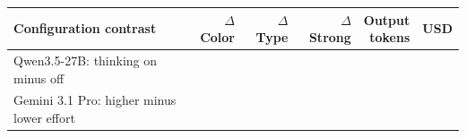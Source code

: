 \begin{tabular}{@{}lrrrrr@{}}
\toprule
Configuration contrast & $\Delta$ Color & $\Delta$ Type & $\Delta$ Strong & \shortstack{Output\\tokens} & USD\\
\midrule
Qwen3.5-27B: thinking on minus off &  &  &  &  & \\
Gemini 3.1 Pro: higher minus lower effort &  &  &  &  & \\
\bottomrule
\end{tabular}

